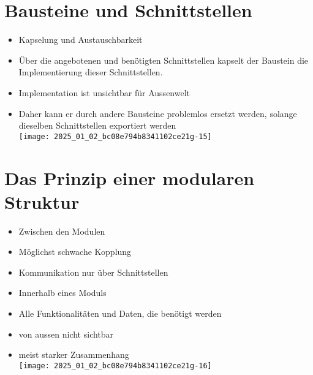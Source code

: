 \documentclass[10pt]{article}
\begin{document}
\section*{Bausteine und Schnittstellen}
\begin{itemize}
  \item Kapselung und Austauschbarkeit
  \item Über die angebotenen und benötigten Schnittstellen kapselt der Baustein die Implementierung dieser Schnittstellen.
  \item Implementation ist unsichtbar für Aussenwelt
  \item Daher kann er durch andere Bausteine problemlos ersetzt werden, solange dieselben Schnittstellen exportiert werden\\
\texttt{[image: 2025\_01\_02\_bc08e794b8341102ce21g-15]}
\end{itemize}

\section*{Das Prinzip einer modularen Struktur}
\begin{itemize}
  \item Zwischen den Modulen
  \item Möglichst schwache Kopplung
  \item Kommunikation nur über Schnittstellen
  \item Innerhalb eines Moduls
  \item Alle Funktionalitäten und Daten, die benötigt werden
  \item von aussen nicht sichtbar
  \item meist starker Zusammenhang\\
\texttt{[image: 2025\_01\_02\_bc08e794b8341102ce21g-16]}
\end{itemize}
\end{document}
